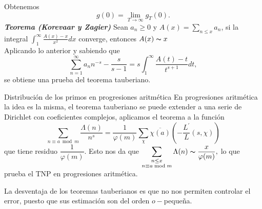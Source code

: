 \documentclass[final]{beamer}
\newlength{\colwidth}
\newcommand{\defi}[1]{\textbf{\emph{#1}}}
\begin{document}
\begin{frame}[t,fragile]
\begin{columns}[t]
\begin{column}{\colwidth}
\begin{center}
\end{center}
Obtenemos \[
g(0) = \lim _{T \rightarrow \infty} g_T(0).
\]
\defi{Teorema (Korevaar y Zagier) }Sean $a_n\geq 0$ y $A(x)=\displaystyle\sum_{n\leq x} a_n$, si  la integral $\displaystyle\int_1^{\infty}\frac{A(x)-x}{x^2}dx$
converge, entonces $A(x)\thicksim x$\\
\vspace*{0.2cm}
Aplicando lo anterior y sabiendo que 
\[
\sum_{n=1}^{\infty}a_nn^{-s} - \frac{s}{s-1} = s \int_1^{\infty} \frac{A(t)-t}{t^{s+1}} d t,
\]
se obtiene una prueba del teorema tauberiano.

\vspace*{0.2cm}
\begin{alertblock}{Distribución de los primos en progresiones aritmética}
En progresiones aritmética la idea es la misma, el teorema tauberiano se puede extender a una serie de  Dirichlet con coeficientes complejos, aplicamos el teorema a la función
$$\sum_{n\equiv a \bmod{m}}\dfrac{\Lambda(n)}{n^s}=\dfrac{1}{\varphi(m)}\sum_{\chi}\overline{\chi(a)}\left(-\dfrac{L^{\prime}}{L}(s,\chi)\right)$$
que tiene residuo $\dfrac{1}{\varphi(m)}$. Esto nos da que $\displaystyle\sum_{\substack{n\leq x\\n\equiv a\bmod{m}}}\Lambda(n)\thicksim \dfrac{x}{\varphi(m)},$
lo que prueba el TNP en progresiones aritmética.
\end{alertblock}

La desventaja de los teoremas tauberianos es que no nos permiten controlar el error, puesto que sus estimación son del orden $o-$pequeña.


\end{column}
\end{columns}
\end{frame}
\end{document}
